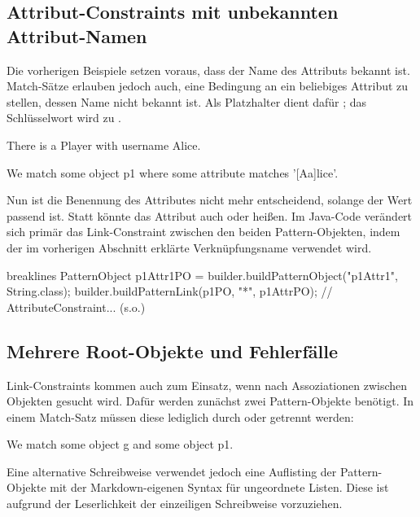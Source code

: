\subsection{Attribut-Constraints mit unbekannten Attribut-Namen}

Die vorherigen Beispiele setzen voraus, dass der Name des Attributs bekannt ist.
Match-Sätze erlauben jedoch auch, eine Bedingung an ein beliebiges Attribut zu stellen, dessen Name nicht bekannt ist.
Als Platzhalter dient dafür ;
das Schlüsselwort  wird zu .

\begin{mdcodeblock}
    There is a Player with username Alice.

    We match some object p1 where some attribute matches '[Aa]lice'.
\end{mdcodeblock}

Nun ist die Benennung des Attributes nicht mehr entscheidend, solange der Wert passend ist.
Statt  könnte das Attribut auch  oder  heißen.
Im Java-Code verändert sich primär das Link-Constraint zwischen den beiden Pattern-Objekten,
indem der im vorherigen Abschnitt erklärte Verknüpfungsname \code{*} verwendet wird.

\begin{jcodeblock*}{breaklines}
    PatternObject p1Attr1PO = builder.buildPatternObject("p1Attr1", String.class);
    builder.buildPatternLink(p1PO, "*", p1AttrPO);
    // AttributeConstraint... (s.o.)
\end{jcodeblock*}

\subsection{Mehrere Root-Objekte und Fehlerfälle}

Link-Constraints kommen auch zum Einsatz, wenn nach Assoziationen zwischen Objekten gesucht wird.
Dafür werden zunächst zwei Pattern-Objekte benötigt.
In einem Match-Satz müssen diese lediglich durch  oder \code{,} getrennt werden:

\begin{mdcodeblock}
    We match some object g and some object p1.
\end{mdcodeblock}

Eine alternative Schreibweise verwendet jedoch eine Auflisting der Pattern-Objekte mit der Markdown-eigenen Syntax für ungeordnete Listen.
Diese ist aufgrund der Leserlichkeit der einzeiligen Schreibweise vorzuziehen.

